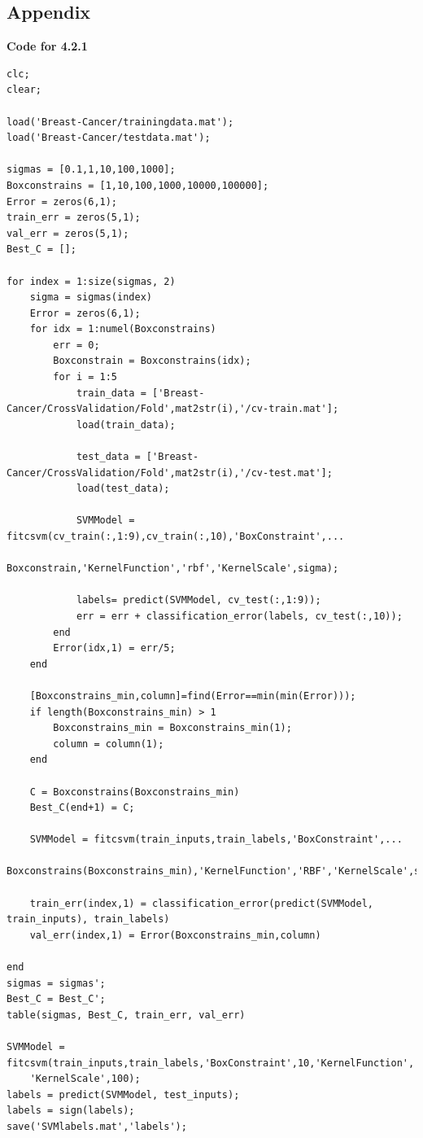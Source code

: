 \documentclass[english]{article}
\begin{document}
\subsection{Appendix}
\textbf{Code for 4.2.1}
\color{red}
\begin{verbatim}
clc;
clear;

load('Breast-Cancer/trainingdata.mat');
load('Breast-Cancer/testdata.mat');

sigmas = [0.1,1,10,100,1000];
Boxconstrains = [1,10,100,1000,10000,100000];
Error = zeros(6,1);
train_err = zeros(5,1);
val_err = zeros(5,1);
Best_C = [];

for index = 1:size(sigmas, 2)
    sigma = sigmas(index)
    Error = zeros(6,1);
    for idx = 1:numel(Boxconstrains)
        err = 0;
        Boxconstrain = Boxconstrains(idx);
        for i = 1:5
            train_data = ['Breast-Cancer/CrossValidation/Fold',mat2str(i),'/cv-train.mat'];
            load(train_data);

            test_data = ['Breast-Cancer/CrossValidation/Fold',mat2str(i),'/cv-test.mat'];
            load(test_data);

            SVMModel = fitcsvm(cv_train(:,1:9),cv_train(:,10),'BoxConstraint',...
                Boxconstrain,'KernelFunction','rbf','KernelScale',sigma);

            labels= predict(SVMModel, cv_test(:,1:9));
            err = err + classification_error(labels, cv_test(:,10));
        end
        Error(idx,1) = err/5;
    end
    
    [Boxconstrains_min,column]=find(Error==min(min(Error)));
    if length(Boxconstrains_min) > 1
        Boxconstrains_min = Boxconstrains_min(1);
        column = column(1);
    end
    
    C = Boxconstrains(Boxconstrains_min)
    Best_C(end+1) = C;
    
    SVMModel = fitcsvm(train_inputs,train_labels,'BoxConstraint',...
        Boxconstrains(Boxconstrains_min),'KernelFunction','RBF','KernelScale',sigma);

    train_err(index,1) = classification_error(predict(SVMModel, train_inputs), train_labels)
    val_err(index,1) = Error(Boxconstrains_min,column)
    
end   
sigmas = sigmas';
Best_C = Best_C';
table(sigmas, Best_C, train_err, val_err)
  
SVMModel = fitcsvm(train_inputs,train_labels,'BoxConstraint',10,'KernelFunction','RBF',...
    'KernelScale',100);
labels = predict(SVMModel, test_inputs);
labels = sign(labels);
save('SVMlabels.mat','labels');
  
\end{verbatim}
\end{document}
